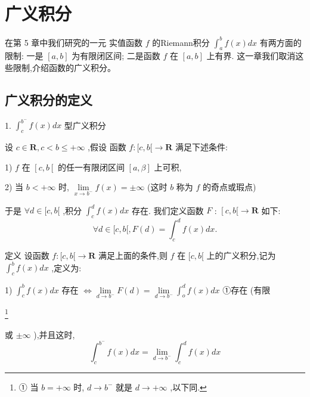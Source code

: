 \chapter{广义积分}

在第 5 章中我们研究的一元 实值函数 $f$ 的Riemann积分 ${\int }_{a}^{b}f\left( x\right) {dx}$ 有两方面的限制: 一是 $\left\lbrack  {a,b}\right\rbrack$ 为有限闭区间; 二是函数 $f$ 在 $\left\lbrack  {a,b}\right\rbrack$ 上有界. 这一章我们取消这些限制,介绍函数的广义积分。

\section{广义积分的定义}

1. ${\int }_{c}^{{b}^{ - }}f\left( x\right) {dx}$ 型广义积分

设 $c \in  \mathbf{R},c < b \leq   + \infty$ ,假设 函数 $f : \lbrack c,b\lbrack  \rightarrow  \mathbf{R}$ 满足下述条件:

1) $f$ 在 $\left\lbrack  {c,b\left\lbrack  \right. }\right.$ 的任一有限闭区间 $\left\lbrack  {a,\beta }\right\rbrack$ 上可积,

2) 当 $b <  + \infty$ 时, $\mathop{\lim }\limits_{{x \rightarrow  {b}^{ - }}}f\left( x\right)  =  \pm  \infty$ (这时 $b$ 称为 $f$ 的奇点或瑕点)

于是 $\forall d \in  \lbrack c,b\lbrack$ ,积分 ${\int }_{c}^{d}f\left( x\right) {dx}$ 存在. 我们定义函数 $F$ : $\left\lbrack  {c,b\lbrack  \rightarrow  \mathbf{R}}\right.$ 如下:
$$\forall d \in  \lbrack c,b\lbrack ,F\left( d\right)  = {\int }_{c}^{d}f\left( x\right) {dx}.$$

定义 设函数 $f : \lbrack c,b\lbrack  \rightarrow  \mathbf{R}$ 满足上面的条件,则 $f$ 在 $\lbrack c,b\lbrack$ 上的广义积分,记为 ${\int }_{c}^{b}f\left( x\right) {dx}$ ,定义为:

1) ${\int }_{c}^{b}f\left( x\right) {dx}$ 存在 $\Leftrightarrow  \mathop{\lim }\limits_{{d \rightarrow  {b}^{ - }}}F\left( d\right)  = \mathop{\lim }\limits_{{d \rightarrow  {b}^{ - }}}{\int }_{o}^{d}f\left( x\right) {dx}$ ①存在 (有限

\footnote{
	
	① 当 $b =  + \infty$ 时, $d \rightarrow  {b}^{ - }$ 就是 $d \rightarrow   + \infty$ ,以下同.
	
}

或 $\pm  \infty$ ),并且这时,
$${\int }_{c}^{{b}^{ - }}f\left( x\right) {dx} = \mathop{\lim }\limits_{{d \rightarrow  {b}^{ - }}}{\int }_{c}^{d}f\left( x\right) {dx}$$

